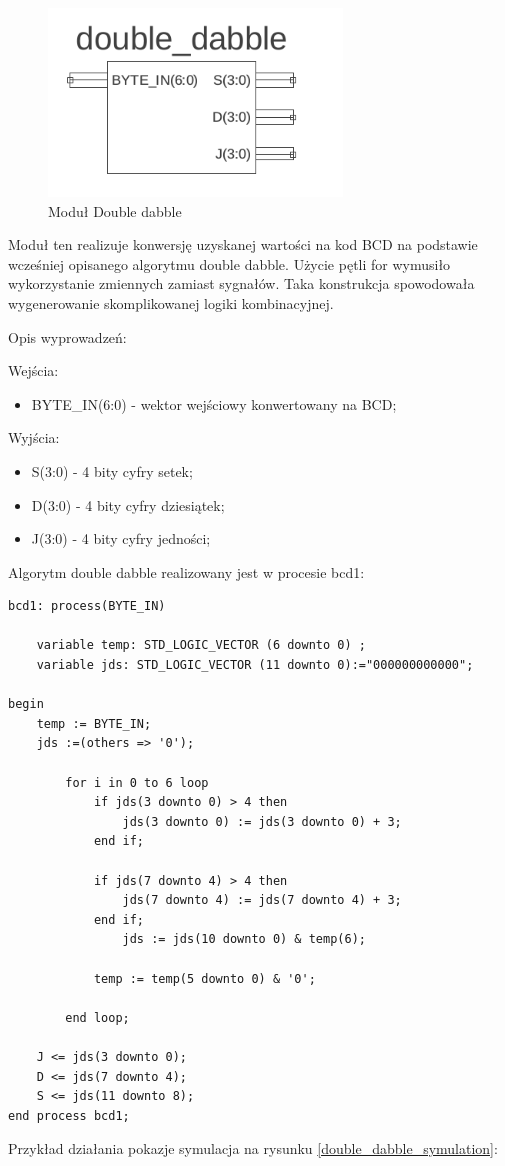\documentclass[a4paper]{article}
\begin{document}
\begin{figure}[H]
\begin{center}
\includegraphics[height=5cm]{graphics/double_dabble_sym.png}
\end{center}
\caption{Moduł Double dabble}
\label{double_dabble_sym}
\end{figure}

Moduł ten realizuje konwersję uzyskanej wartości na kod BCD na podstawie wcześniej opisanego algorytmu double dabble. Użycie pętli for wymusiło wykorzystanie zmiennych zamiast sygnałów. Taka konstrukcja spowodowała wygenerowanie skomplikowanej logiki kombinacyjnej.

Opis wyprowadzeń:

Wejścia:
\begin{itemize}
\item BYTE\_IN(6:0) - wektor wejściowy konwertowany na BCD;
\end{itemize}

Wyjścia:
\begin{itemize}
\item S(3:0) - 4 bity cyfry setek;
\item D(3:0) - 4 bity cyfry dziesiątek;
\item J(3:0) -  4 bity cyfry jedności;
\end{itemize}

Algorytm double dabble realizowany jest w procesie bcd1:

\lstset{language=VHDL}
\begin{lstlisting}[frame=single]
bcd1: process(BYTE_IN)

	variable temp: STD_LOGIC_VECTOR (6 downto 0) ;
	variable jds: STD_LOGIC_VECTOR (11 downto 0):="000000000000";

begin	
	temp := BYTE_IN; 
	jds :=(others => '0');

		for i in 0 to 6 loop
			if jds(3 downto 0) > 4 then 
				jds(3 downto 0) := jds(3 downto 0) + 3;
			end if;
     
			if jds(7 downto 4) > 4 then 
				jds(7 downto 4) := jds(7 downto 4) + 3;
			end if;
				jds := jds(10 downto 0) & temp(6);
			 
			temp := temp(5 downto 0) & '0';
			
		end loop;
		
	J <= jds(3 downto 0);
	D <= jds(7 downto 4);
	S <= jds(11 downto 8);
end process bcd1; 
\end{lstlisting}
Przykład działania pokazje symulacja na rysunku \ref{double_dabble_symulation}:
\end{document}
